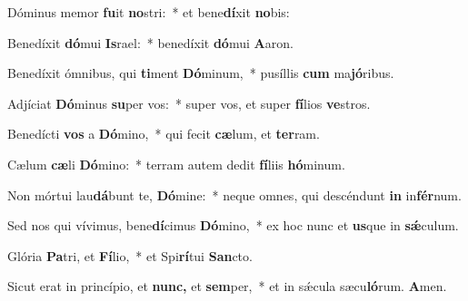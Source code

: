 \item Dóminus memor \textbf{fu}it \textbf{no}stri:~* et bene\textbf{dí}xit \textbf{no}bis:
\item Benedíxit \textbf{dó}mui \textbf{Is}rael:~* benedíxit \textbf{dó}mui \textbf{A}aron.
\item Benedíxit ómnibus, qui \textbf{ti}ment \textbf{Dó}minum,~* pusíllis \textbf{cum} ma\textbf{jó}ribus.
\item Adjíciat \textbf{Dó}minus \textbf{su}per vos:~* super vos, et super \textbf{fí}lios \textbf{ve}stros.
\item Benedícti \textbf{vos} a \textbf{Dó}mino,~* qui fecit \textbf{cæ}lum, et \textbf{ter}ram.
\item Cælum \textbf{cæ}li \textbf{Dó}mino:~* terram autem dedit \textbf{fí}liis \textbf{hó}minum.
\item Non mórtui lau\textbf{dá}bunt te, \textbf{Dó}mine:~* neque o\-mnes, qui descéndunt \textbf{in} in\textbf{fér}num.
\item Sed nos qui vívimus, bene\textbf{dí}cimus \textbf{Dó}mino,~* ex hoc nunc et \textbf{us}que in \textbf{sǽ}culum.
\item Glória \textbf{Pa}tri, et \textbf{Fí}lio,~* et Spi\textbf{rí}tui \textbf{San}cto.
\item Sicut erat in princípio, et \textbf{nunc,} et \textbf{sem}per,~* et in sǽcula sæcu\textbf{ló}rum. \textbf{A}men.
